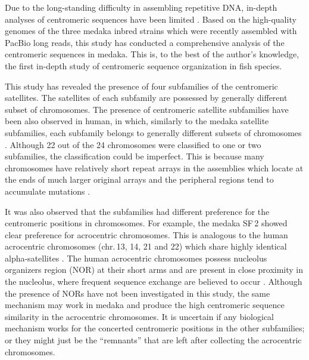 Due to the long-standing difficulty in assembling repetitive DNA, in-depth analyses of centromeric sequences have been limited \cite{Plohl2014}. Based on the high-quality genomes of the three medaka inbred strains which were recently assembled with PacBio long reads, this study has conducted a comprehensive analysis of the centromeric sequences in medaka. This is, to the best of the author's knowledge, the first in-depth study of centromeric sequence organization in fish species.

This study has revealed the presence of four subfamilies of the centromeric satellites. The satellites of each subfamily are possessed by generally different subset of chromosomes. The presence of centromeric satellite subfamilies have been also observed in human, in which, similarly to the medaka satellite subfamilies, each subfamily belongs to generally different subsets of chromosomes \cite{Alexandrov2001}. Although 22 out of the 24 chromosomes were classified to one or two subfamilies, the classification could be imperfect. This is because many chromosomes have relatively short repeat arrays in the assemblies which locate at the ends of much larger original arrays and the peripheral regions tend to accumulate mutations \cite{Smith1976, Schueler2001}.

It was also observed that the subfamilies had different preference for the centromeric positions in chromosomes. For example, the medaka SF\,2 showed clear preference for acrocentric chromosomes. This is analogous to the human acrocentric chromosomes (chr.\,13, 14, 21 and 22) which share highly identical alpha-satellites \cite{Willard1991}. The human acrocentric chromosomes possess nucleolus organizers region (NOR) at their short arms and are present in close proximity in the nucleolus, where frequent sequence exchange are believed to occur \cite{Willard1991}. Although the presence of NORs have not been investigated in this study, the same mechanism may work in medaka and produce the high centromeric sequence similarity in the acrocentric chromosomes. It is uncertain if any biological mechanism works for the concerted centromeric positions in the other subfamilies; or they might just be the ``remnants'' that are left after collecting the acrocentric chromosomes.

